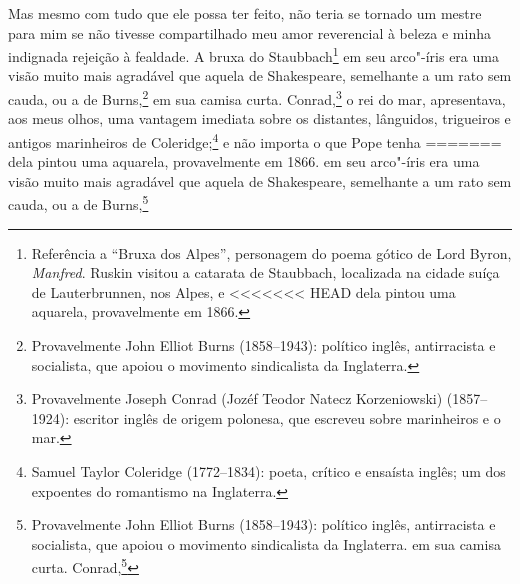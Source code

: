 {{{{{{{{{{{{{{{{{{{{{{{{{{{{{{{{{{{{{{{{{{{{{{{{{{{{{Mas mesmo com tudo que ele possa ter feito, não teria se tornado um
mestre para mim se não tivesse compartilhado meu amor reverencial à
beleza e minha indignada rejeição à fealdade. A bruxa do
Staubbach\footnote{Referência a ``Bruxa dos Alpes'', personagem do poema
  gótico de Lord Byron, \textit{Manfred}. Ruskin visitou a catarata de
  Staubbach, localizada na cidade suíça de Lauterbrunnen, nos Alpes, e
<<<<<<< HEAD
  dela pintou uma aquarela, provavelmente em 1866.} em
seu arco"-íris era uma visão muito mais agradável que aquela de
Shakespeare, semelhante a um rato sem cauda, ou a de Burns,\footnote{Provavelmente
  John Elliot Burns (1858--1943): político inglês, antirracista e
  socialista, que apoiou o movimento sindicalista da Inglaterra.} em sua camisa curta. Conrad,\footnote{Provavelmente Joseph
  Conrad (Jozéf Teodor Natecz Korzeniowski) (1857--1924): escritor inglês
  de origem polonesa, que escreveu sobre marinheiros e o mar.} o rei do mar, apresentava, aos meus olhos, uma vantagem
imediata sobre os distantes, lânguidos, trigueiros e antigos marinheiros
de Coleridge;\footnote{Samuel Taylor Coleridge (1772--1834): poeta,
  crítico e ensaísta inglês; um dos expoentes do romantismo na
  Inglaterra.} e não importa o que Pope tenha
=======
  dela pintou uma aquarela, provavelmente em 1866.  em
seu arco"-íris era uma visão muito mais agradável que aquela de
Shakespeare, semelhante a um rato sem cauda, ou a de Burns,\footnote{Provavelmente
  John Elliot Burns (1858--1943): político inglês, antirracista e
  socialista, que apoiou o movimento sindicalista da Inglaterra.  em sua camisa curta. Conrad,\footnote{Provavelmente Joseph
  Conrad (Jozéf Teodor Natecz Korzeniowski) (1857--1924): escritor inglês
  de origem polonesa, que escreveu sobre marinheiros e o mar.  o rei do mar, apresentava, aos meus olhos, uma vantagem
imediata sobre os distantes, lânguidos, trigueiros e antigos marinheiros
de Coleridge;\footnote{Samuel Taylor Coleridge (1772--1834): poeta,
  crítico e ensaísta inglês; um dos expoentes do romantismo na
  Inglaterra.  e não importa o que Pope tenha
>>>>>>> 7ef31cc2a6d5603f856fee4c85bc83700040648c
graciosamente dito, ou honestamente sentido dos bosques e das águas de
Windsor, ele estava apenas tilintando címbalos para mim, em comparação
ao amor de Byron por Lachin"-y"-Gair.

}}}}}}}}}}}}}}}}}}}}}}}}}}}}}}}}}}}}}}}}}}}}}}}}}}}}}}}}
